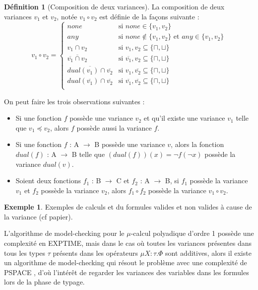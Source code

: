 \documentclass{rapport}
\theoremstyle{plain}
\theoremstyle{remark}
\theoremstyle{definition}
\newtheorem{dfn}{Définition}
\newtheorem{exem}{Exemple}
\begin{document}
\begin{dfn} [Composition de deux variances] La composition de deux variances $v_1$ et $v_2$, notée $v_1 \circ v_2$ est définie de la façons suivante : 
\[v_1 \circ v_2 = \left\{
\begin{array}{ll}
none & \text{si }none \in \{v_1, v_2\}\\
any & \text{si }none \notin \{v_1, v_2\} \text{ et } any \in \{v_1, v_2\}\\
v_1 \cap v_2 & \text{si }v_1, v_2 \subseteq \{\sqcap, \sqcup\}\\
\overline{\overline{v_1} \cap v_2} & \text{si }\overline{v_1}, v_2 \subseteq \{\sqcap, \sqcup\}\\
\overline{dual(v_1) \cap \overline{v_2}} & \text{si }v_1, \overline{v_2} \subseteq \{\sqcap, \sqcup\}\\
dual(\overline{v_1}) \cap \overline{v_2} & \text{si }\overline{v_1}, \overline{v_2} \subseteq \{\sqcap, \sqcup\}\\
\end{array}\right.\]
\end{dfn}

On peut faire les trois observations suivantes :
\begin{itemize}
	\item Si une fonction $f$ possède une variance $v_2$ et qu'il existe une variance $v_1$ telle que $v_1 \preccurlyeq v_2$, alors $f$ possède aussi la variance $f$.
	\item Si une fonction $f$ : A $\rightarrow$ B possède une variance $v$, alors la fonction $dual(f)$ : A $\rightarrow$ B telle que $(dual(f))(x) = \neg f(\neg x)$ possède la variance $dual(v)$.
	\item Soient deux fonctions $f_1$ : B $\rightarrow$ C et $f_2$ : A $\rightarrow$ B, si $f_1$ possède la variance $v_1$ et $f_2$ possède la variance $v_2$, alors $f_1 \circ f_2$ possède la variance $v_1 \circ v_2$.
\end{itemize}

\begin{exem}
Exemples de calculs et du formules valides et non valides à cause de la variance (cf papier).
\end{exem}

L'algorithme de model-checking pour le $\mu$-calcul polyadique d'ordre 1 possède une complexité en EXPTIME, mais dans le cas où toutes les variances présentes dans tous les types $\tau$ présents dans les opérateurs ${\mu X : \tau . \Phi}$ sont additives, alors il existe un algorithme de model-checking qui résout le problème avec une complexité de PSPACE \citep{lange2014model}, d'où l'intérêt de regarder les variances des variables dans les formules lors de la phase de typage. 
\end{document}
